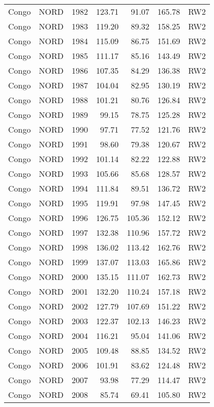 \begin{longtable}{lllrrrl}
  Congo & NORD & 1982 & 123.71 & 91.07 & 165.78 & RW2 \\ 
  Congo & NORD & 1983 & 119.20 & 89.32 & 158.25 & RW2 \\ 
  Congo & NORD & 1984 & 115.09 & 86.75 & 151.69 & RW2 \\ 
  Congo & NORD & 1985 & 111.17 & 85.16 & 143.49 & RW2 \\ 
  Congo & NORD & 1986 & 107.35 & 84.29 & 136.38 & RW2 \\ 
  Congo & NORD & 1987 & 104.04 & 82.95 & 130.19 & RW2 \\ 
  Congo & NORD & 1988 & 101.21 & 80.76 & 126.84 & RW2 \\ 
  Congo & NORD & 1989 & 99.15 & 78.75 & 125.28 & RW2 \\ 
  Congo & NORD & 1990 & 97.71 & 77.52 & 121.76 & RW2 \\ 
  Congo & NORD & 1991 & 98.60 & 79.38 & 120.67 & RW2 \\ 
  Congo & NORD & 1992 & 101.14 & 82.22 & 122.88 & RW2 \\ 
  Congo & NORD & 1993 & 105.66 & 85.68 & 128.57 & RW2 \\ 
  Congo & NORD & 1994 & 111.84 & 89.51 & 136.72 & RW2 \\ 
  Congo & NORD & 1995 & 119.91 & 97.98 & 147.45 & RW2 \\ 
  Congo & NORD & 1996 & 126.75 & 105.36 & 152.12 & RW2 \\ 
  Congo & NORD & 1997 & 132.38 & 110.96 & 157.72 & RW2 \\ 
  Congo & NORD & 1998 & 136.02 & 113.42 & 162.76 & RW2 \\ 
  Congo & NORD & 1999 & 137.07 & 113.03 & 165.86 & RW2 \\ 
  Congo & NORD & 2000 & 135.15 & 111.07 & 162.73 & RW2 \\ 
  Congo & NORD & 2001 & 132.20 & 110.24 & 157.18 & RW2 \\ 
  Congo & NORD & 2002 & 127.79 & 107.69 & 151.22 & RW2 \\ 
  Congo & NORD & 2003 & 122.37 & 102.13 & 146.23 & RW2 \\ 
  Congo & NORD & 2004 & 116.21 & 95.04 & 141.06 & RW2 \\ 
  Congo & NORD & 2005 & 109.48 & 88.85 & 134.52 & RW2 \\ 
  Congo & NORD & 2006 & 101.91 & 83.62 & 124.48 & RW2 \\ 
  Congo & NORD & 2007 & 93.98 & 77.29 & 114.47 & RW2 \\ 
  Congo & NORD & 2008 & 85.74 & 69.41 & 105.80 & RW2 \\ 

\end{longtable}
